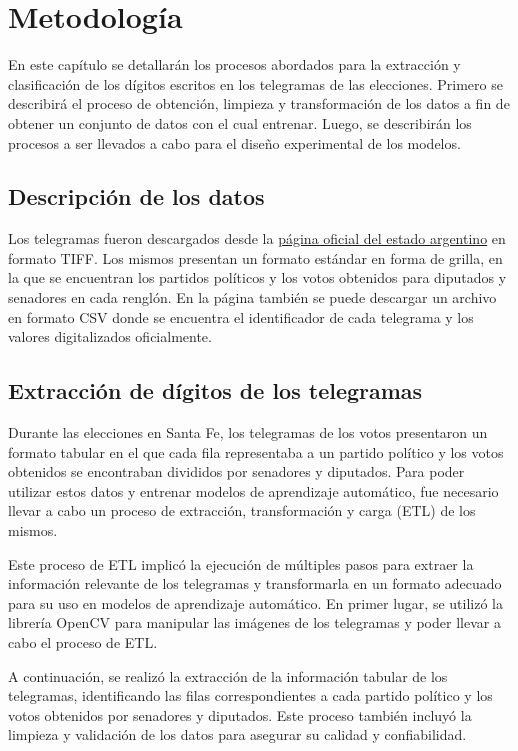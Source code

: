 \chapter{Metodología}

\label{Chapter3}

En este capítulo se detallarán los procesos abordados para la extracción y clasificación de los dígitos escritos en los
telegramas de las elecciones. Primero se describirá el proceso de obtención, limpieza y transformación de los datos a
fin de obtener un conjunto de datos con el cual entrenar. Luego, se describirán los procesos a ser llevados a cabo para
el diseño experimental de los modelos.

\section{Descripción de los datos}

Los telegramas fueron descargados desde la \href{https://op.elecciones.gob.ar/telegramas/generales2021/}{página oficial
    del estado argentino} en formato TIFF. Los mismos presentan un formato estándar en forma de grilla, en la que se
encuentran los partidos políticos y los votos obtenidos para diputados y senadores en cada renglón. En la página
también se puede descargar un archivo en formato CSV donde se encuentra el identificador de cada telegrama y los
valores digitalizados oficialmente.

\section{Extracción de dígitos de los telegramas}

Durante las elecciones en Santa Fe, los telegramas de los votos presentaron un formato tabular en el que cada fila
representaba a un partido político y los votos obtenidos se encontraban divididos por senadores y diputados. Para poder
utilizar estos datos y entrenar modelos de aprendizaje automático, fue necesario llevar a cabo un proceso de
extracción, transformación y carga (ETL) de los mismos.

Este proceso de ETL implicó la ejecución de múltiples pasos para extraer la información relevante de los telegramas y
transformarla en un formato adecuado para su uso en modelos de aprendizaje automático. En primer lugar, se utilizó la
librería OpenCV \parencite{opencv_library} para manipular las imágenes de los telegramas y poder llevar a cabo el proceso de ETL.

A continuación, se realizó la extracción de la información tabular de los telegramas, identificando las filas
correspondientes a cada partido político y los votos obtenidos por senadores y diputados. Este proceso también incluyó
la limpieza y validación de los datos para asegurar su calidad y confiabilidad.

